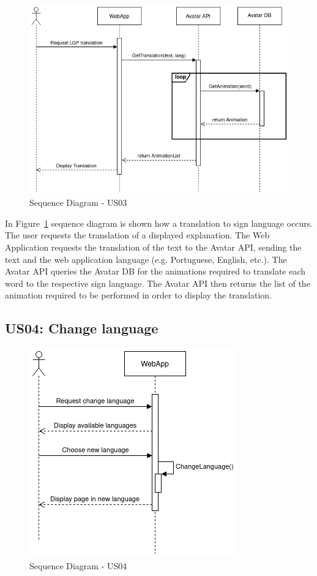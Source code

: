 \begin{figure}[H]
\centering
\includegraphics[scale=0.45]{ch4/assets/US03_SD.png}
\caption[Sequence Diagram US03]{Sequence Diagram - US03}
\label{fig:sdus03}
\end{figure}

In Figure~\ref{fig:sdus03} sequence diagram is shown how a translation to sign language occurs.
The user requests the translation of a displayed explanation.
The Web Application requests the translation of the text to the Avatar API, sending the text and the web application language (e.g. Portuguese, English, etc.).
The Avatar API queries the Avatar DB for the animations required to translate each word to the respective sign language.
The Avatar API then returns the list of the animation required to be performed in order to display the translation.

\subsection{US04: Change language}

\begin{figure}[H]
\centering
\includegraphics[scale=0.45]{ch4/assets/US04_SD.png}
\caption[Sequence Diagram US04]{Sequence Diagram - US04}
\label{fig:sdus04}
\end{figure}

